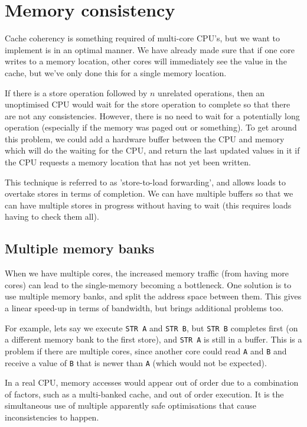 
\section{Memory consistency}

Cache coherency is something required of multi-core CPU's, but we want
to implement is in an optimal manner. We have already made sure that
if one core writes to a memory location, other cores will immediately
see the value in the cache, but we've only done this for a single
memory location.

If there is a store operation followed by $n$ unrelated operations,
then an unoptimised CPU would wait for the store operation to complete
so that there are not any consistencies. However, there is no need to
wait for a potentially long operation (especially if the memory was
paged out or something). To get around this problem, we could add a
hardware buffer between the CPU and memory which will do the waiting
for the CPU, and return the last updated values in it if the CPU
requests a memory location that has not yet been written.

This technique is referred to as 'store-to-load forwarding', and
allows loads to overtake stores in terms of completion. We can have
multiple buffers so that we can have multiple stores in progress
without having to wait (this requires loads having to check them all).

\subsection{Multiple memory banks}

When we have multiple cores, the increased memory traffic (from having
more cores) can lead to the single-memory becoming a bottleneck. One
solution is to use multiple memory banks, and split the address space
between them. This gives a linear speed-up in terms of bandwidth, but
brings additional problems too.

For example, lets say we execute \texttt{STR A} and \texttt{STR B},
but \texttt{STR B} completes first (on a different memory bank to the
first store), and \texttt{STR A} is still in a buffer. This is a
problem if there are multiple cores, since another core could
read \texttt{A} and \texttt{B} and receive a value of \texttt{B} that
is newer than \texttt{A} (which would not be expected).

In a real CPU, memory accesses would appear out of order due to a
combination of factors, such as a multi-banked cache, and out of order
execution. It is the simultaneous use of multiple apparently safe
optimisations that cause inconsistencies to happen.

